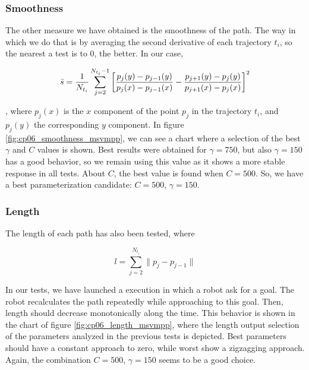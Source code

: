 \subsubsection{Smoothness}\label{ch:chapter06_02_01_02}

The other measure we have obtained is the smoothness of the path. The way in which we do that is by averaging the second derivative of each trajectory $t_i$, so the nearest a test is to $0$, the better. In our case,

\begin{equation}\label{eq:cp06_avg_smooth}
  \bar{s} = {1 \over N_{t_i}} \sum_{j=2}^{N_{t_i} - 1} \left[ {{p_j(y) - p_{j-1}(y)} \over {p_j(x) - p_{j-1}(x)}} - {{p_{j + 1}(y) - p_j(y)} \over {p_{j + 1}(x) - p_j(x)}} \right]^2
\end{equation}

, where $p_j(x)$ is the $x$ component of the point $p_j$ in the trajectory $t_i$, and $p_j(y)$ the corresponding $y$ component. In figure \ref{fig:cp06_smoothness_msvmpp}, we can see a chart where a selection of the best $\gamma$ and $C$ values is shown. Best results were obtained for $\gamma=750$, but also $\gamma=150$ has a good behavior, so we remain using this value as it shows a more stable response in all tests. About $C$, the best value is found when $C=500$. So, we have a best parameterization candidate: $C=500$, $\gamma=150$.

\subsubsection{Length}\label{ch:chapter06_02_01_03}

The length of each path has also been tested, where

\begin{equation}\label{eq:cp06_length}
  l = \sum_{j=2}^{N_{t_i}} \| p_j - p_{j - 1}\|
\end{equation}

In our tests, we have launched a execution in which a robot ask for a goal. The robot recalculates the path repeatedly while approaching to this goal. Then, length should decrease monotonically along the time. This behavior is shown in the chart of figure \ref{fig:cp06_length_msvmpp}, where the length output selection of the parameters analyzed in the previous tests is depicted. Best parameters should have a constant approach to zero, while worst show a zigzagging approach. Again, the combination $C=500$, $\gamma=150$ seems to be a good choice.

